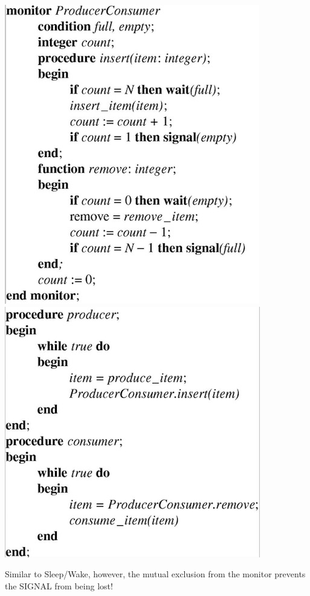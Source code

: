 \documentclass[11pt,a4paper]{article}
\theoremstyle{definition}
\begin{document}
\begin{tcolorbox}
	\begin{center}
		\includegraphics[scale=0.4]{m1/producerConsumerMonitor1}
		\includegraphics[scale=0.4]{m1/producerConsumerMonitor2}
	\end{center}
	
	Similar to Sleep/Wake, however, the mutual exclusion from the monitor prevents the SIGNAL from being lost! 
\end{tcolorbox}
\end{document}

